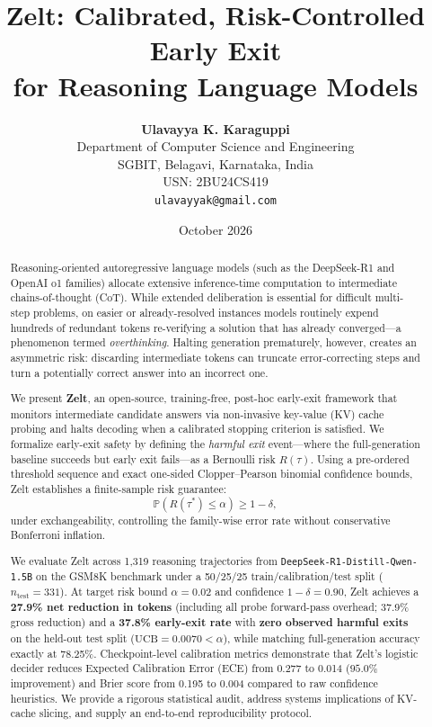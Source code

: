 \documentclass[11pt]{article}
\title{\textbf{Zelt: Calibrated, Risk-Controlled Early Exit\\
for Reasoning Language Models}}
\author{\textbf{Ulavayya K. Karaguppi}\\
Department of Computer Science and Engineering\\
SGBIT, Belagavi, Karnataka, India\\
USN: 2BU24CS419\\
\texttt{ulavayyak@gmail.com}}
\date{October 2026}
\newcommand{\Prb}{\mathbb{P}}
\begin{document}
\maketitle

\begin{abstract}
Reasoning-oriented autoregressive language models (such as the DeepSeek-R1 and OpenAI o1 families) allocate extensive inference-time computation to intermediate chains-of-thought (CoT). While extended deliberation is essential for difficult multi-step problems, on easier or already-resolved instances models routinely expend hundreds of redundant tokens re-verifying a solution that has already converged---a phenomenon termed \emph{overthinking}. Halting generation prematurely, however, creates an asymmetric risk: discarding intermediate tokens can truncate error-correcting steps and turn a potentially correct answer into an incorrect one.

We present \textbf{Zelt}, an open-source, training-free, post-hoc early-exit framework that monitors intermediate candidate answers via non-invasive key-value (KV) cache probing and halts decoding when a calibrated stopping criterion is satisfied. We formalize early-exit safety by defining the \emph{harmful exit} event---where the full-generation baseline succeeds but early exit fails---as a Bernoulli risk $R(\tau)$. Using a pre-ordered threshold sequence and exact one-sided Clopper--Pearson binomial confidence bounds, Zelt establishes a finite-sample risk guarantee:
\[
  \Prb\!\left(R(\tau^*) \le \alpha\right) \ge 1 - \delta,
\]
under exchangeability, controlling the family-wise error rate without conservative Bonferroni inflation.

We evaluate Zelt across 1{,}319 reasoning trajectories from \texttt{DeepSeek-R1-Distill-Qwen-1.5B} on the GSM8K benchmark under a 50/25/25 train/calibration/test split ($n_{\mathrm{test}}=331$). At target risk bound $\alpha = 0.02$ and confidence $1-\delta = 0.90$, Zelt achieves a \textbf{27.9\% net reduction in tokens} (including all probe forward-pass overhead; 37.9\% gross reduction) and a \textbf{37.8\% early-exit rate} with \textbf{zero observed harmful exits} on the held-out test split ($\mathrm{UCB} = 0.0070 < \alpha$), while matching full-generation accuracy exactly at 78.25\%. Checkpoint-level calibration metrics demonstrate that Zelt's logistic decider reduces Expected Calibration Error (ECE) from 0.277 to 0.014 ($95.0\%$ improvement) and Brier score from 0.195 to 0.004 compared to raw confidence heuristics. We provide a rigorous statistical audit, address systems implications of KV-cache slicing, and supply an end-to-end reproducibility protocol.
\end{abstract}
\end{document}
